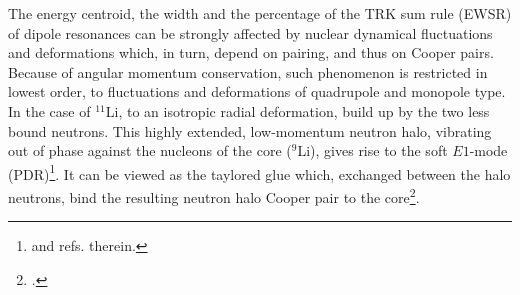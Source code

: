   The energy centroid, the width and the percentage of the TRK sum rule (EWSR) of dipole resonances can be strongly affected by nuclear dynamical fluctuations and deformations which, in turn, depend on pairing, and thus on Cooper pairs. Because of angular momentum conservation, such phenomenon is restricted in lowest order, to fluctuations and deformations of quadrupole and monopole type. In the case of $^{11}$Li, to an isotropic radial deformation, build up by the two less bound neutrons. This highly extended, low-momentum neutron halo, vibrating out of phase against the nucleons of the core ($^9$Li), gives rise to the soft $E1$-mode (PDR)\footnote{\cite{Broglia:19} and refs. therein.}.  It can be viewed as the taylored glue which, exchanged between the halo neutrons, bind the resulting neutron halo Cooper pair to the core\footnote{\cite{Barranco:01}.}.


